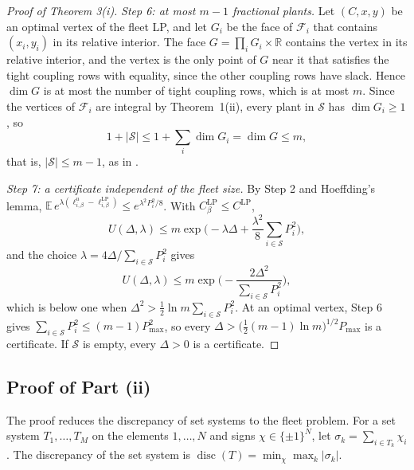 \documentclass[11pt]{article}
\newcommand{\calF}{\mathcal{F}}
\newcommand{\calS}{\mathcal{S}}
\newcommand{\CLP}{C^{\mathrm{LP}}}
\newcommand{\disc}{\operatorname{disc}}
\begin{document}
\begin{proof}[Proof of Theorem 3(i)]
\emph{Step 6: at most $m-1$ fractional plants.} Let $(C,x,y)$ be an optimal vertex of the fleet LP, and let $G_i$ be the
face of $\calF_i$ that contains $(x_i,y_i)$ in its relative interior. The face $G=\prod_iG_i\times\mathbb R$ contains
the vertex in its relative interior, and the vertex is the only point of $G$ near it that satisfies the tight coupling
rows with equality, since the other coupling rows have slack. Hence $\dim G$ is at most the number of tight coupling
rows, which is at most $m$. Since the vertices of $\calF_i$ are integral by Theorem~1(ii), every plant in $\calS$ has
$\dim G_i\ge1$, so
\[
1+|\calS|\le1+\sum_i\dim G_i=\dim G\le m,
\]
that is, $|\calS|\le m-1$, as in \cite{vujanic2016automatica}.

\emph{Step 7: a certificate independent of the fleet size.} By Step 2 and Hoeffding's lemma, $\mathbb
E\,e^{\lambda(\ell^u_{i,\beta}-\ell^{\mathrm{LP}}_{i,\beta})}\le e^{\lambda^2P_i^2/8}$. With $\CLP_\beta\le\CLP$,
\[
U(\Delta,\lambda)\le m\exp\Big(-\lambda\Delta+\frac{\lambda^2}{8}\sum_{i\in\calS}P_i^2\Big),
\]
and the choice $\lambda=4\Delta/\sum_{i\in\calS}P_i^2$ gives
\[
U(\Delta,\lambda)\le m\exp\Big(-\frac{2\Delta^2}{\sum_{i\in\calS}P_i^2}\Big),
\]
which is below one when $\Delta^2>\tfrac12\ln m\sum_{i\in\calS}P_i^2$. At an optimal vertex, Step 6 gives
$\sum_{i\in\calS}P_i^2\le(m-1)P_{\max}^2$, so every $\Delta>\big(\tfrac12(m-1)\ln m\big)^{1/2}P_{\max}$ is a
certificate. If $\calS$ is empty, every $\Delta>0$ is a certificate.
\end{proof}

\subsection{Proof of Part (ii)}

The proof reduces the discrepancy of set systems to the fleet problem. For a set system $T_1,\dots,T_M$ on the
elements $1,\dots,N$ and signs $\chi\in\{\pm1\}^N$, let $\sigma_k=\sum_{i\in T_k}\chi_i$. The discrepancy of the set
system is $\disc(T)=\min_\chi\max_k|\sigma_k|$.
\end{document}
